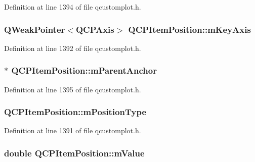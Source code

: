 Definition at line 1394 of file qcustomplot.\-h.

\hypertarget{class_q_c_p_item_position_a53fa450dbdc43101ef268e04ffbe6765}{
\subsubsection[{m\-Key\-Axis}]{\setlength{\rightskip}{0pt plus 5cm}Q\-Weak\-Pointer$<${\bf Q\-C\-P\-Axis}$>$ Q\-C\-P\-Item\-Position\-::m\-Key\-Axis\hspace{0.3cm}{\ttfamily [protected]}}}\label{class_q_c_p_item_position_a53fa450dbdc43101ef268e04ffbe6765}


Definition at line 1392 of file qcustomplot.\-h.

\hypertarget{class_q_c_p_item_position_a21e37c5a8cabe747a2c60773b23eddeb}{
\subsubsection[{m\-Parent\-Anchor}]{$\ast$ Q\-C\-P\-Item\-Position\-::m\-Parent\-Anchor\hspace{0.3cm}{\ttfamily [protected]}}}\label{class_q_c_p_item_position_a21e37c5a8cabe747a2c60773b23eddeb}


Definition at line 1395 of file qcustomplot.\-h.

\hypertarget{class_q_c_p_item_position_ac9c7bbca809601323d3ae2542ef2801a}{
\subsubsection[{m\-Position\-Type}]{ Q\-C\-P\-Item\-Position\-::m\-Position\-Type\hspace{0.3cm}{\ttfamily [protected]}}}\label{class_q_c_p_item_position_ac9c7bbca809601323d3ae2542ef2801a}


Definition at line 1391 of file qcustomplot.\-h.

\hypertarget{class_q_c_p_item_position_a67bf5df69f587d53731724a7d61c6c3f}{
\subsubsection[{m\-Value}]{\setlength{\rightskip}{0pt plus 5cm}double Q\-C\-P\-Item\-Position\-::m\-Value\hspace{0.3cm}{\ttfamily [protected]}}}\label{class_q_c_p_item_position_a67bf5df69f587d53731724a7d61c6c3f}


